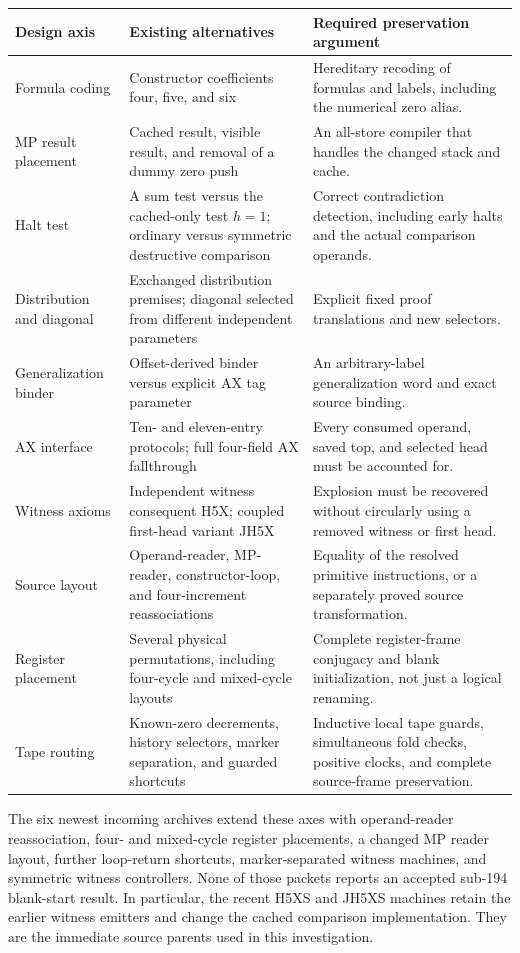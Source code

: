 \documentclass[11pt,a4paper]{article}
\theoremstyle{definition}\newtheorem{definition}[theorem]{Definition}
\theoremstyle{remark}\newtheorem{remark}[theorem]{Remark}
\begin{document}
\begin{longtable}{@{}p{.23\linewidth}p{.37\linewidth}p{.34\linewidth}@{}}
\toprule
Design axis & Existing alternatives & Required preservation argument\\
\midrule\endhead
Formula coding & Constructor coefficients four, five, and six & Hereditary
recoding of formulas and labels, including the numerical zero alias.\\
MP result placement & Cached result, visible result, and removal of a dummy
zero push & An all-store compiler that handles the changed stack and cache.\\
Halt test & A sum test versus the cached-only test $h=1$; ordinary versus
symmetric destructive comparison & Correct contradiction detection,
including early halts and the actual comparison operands.\\
Distribution and diagonal & Exchanged distribution premises; diagonal
selected from different independent parameters & Explicit fixed proof
translations and new selectors.\\
Generalization binder & Offset-derived binder versus explicit AX tag
parameter & An arbitrary-label generalization word and exact source binding.\\
AX interface & Ten- and eleven-entry protocols; full four-field AX
fallthrough & Every consumed operand, saved top, and selected head must be
accounted for.\\
Witness axioms & Independent witness consequent H5X; coupled first-head
variant JH5X & Explosion must be recovered without circularly using a
removed witness or first head.\\
Source layout & Operand-reader, MP-reader, constructor-loop, and
four-increment reassociations & Equality of the resolved primitive
instructions, or a separately proved source transformation.\\
Register placement & Several physical permutations, including four-cycle
and mixed-cycle layouts & Complete register-frame conjugacy and blank
initialization, not just a logical renaming.\\
Tape routing & Known-zero decrements, history selectors, marker separation,
and guarded shortcuts & Inductive local tape guards, simultaneous fold
checks, positive clocks, and complete source-frame preservation.\\
\bottomrule
\end{longtable}

The six newest incoming archives extend these axes with operand-reader
reassociation, four- and mixed-cycle register placements, a changed MP
reader layout, further loop-return shortcuts, marker-separated witness
machines, and symmetric witness controllers\cite{incoming}. None of those packets reports
an accepted sub-194 blank-start result. In particular, the recent H5XS and
JH5XS machines retain the earlier witness emitters and change the cached
comparison implementation. They are the immediate source parents used
in this investigation.
\end{document}

